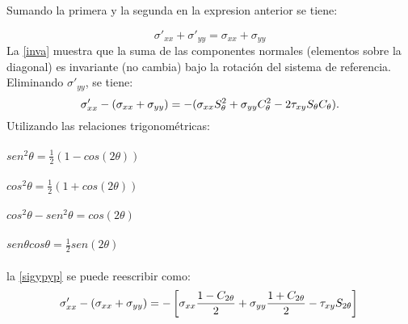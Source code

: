 \documentclass[../notas medios.tex]{subfiles}
\begin{document}
Sumando la primera y la  segunda en la expresion anterior se tiene:

\begin{equation}
	\sigma ' _{xx} + \sigma ' _{yy} =   \sigma _{xx} +  \sigma _{yy}
	\label{inva}
\end{equation}
%
La  \cref{inva} muestra que la suma de las componentes normales (elementos sobre la diagonal) es invariante (no cambia) bajo la rotación del sistema de referencia. Eliminando $\sigma ' _{yy}$, se tiene:\\
%
\begin{equation}
	\sigma ' _{xx} -(\sigma _{xx} + \sigma _{yy}) = -(\sigma _{xx} S^2 _\theta + \sigma _{yy} C^2 _\theta - 2 \tau _{xy} S _\theta C_\theta). \\
\label{sigypyp}
\end{equation}
%
Utilizando las relaciones trigonométricas:\\
\\
	$sen ^2 \theta = \frac{1}{2} \left( 1 - cos \left( 2 \theta \right) \right)$\\\\
	$cos ^2 \theta = \frac{1}{2} \left( 1 + cos \left( 2 \theta \right) \right)$\\\\
	$ cos ^2 \theta -sen ^2 \theta =  cos \left( 2 \theta \right)$\\\\
	$sen \theta cos  \theta = \frac{1}{2} sen \left( 2 \theta \right)$ \\\\
%
la \cref{sigypyp} se puede reescribir como: \\

\begin{equation*}
	\sigma ' _{xx} -(\sigma _{xx} + \sigma _{yy}) = -\left[ \sigma _{xx} \frac{1-C_{2\theta}}{2} + \sigma _{yy} \frac{1+ C _{2\theta}}{2} - \tau _{xy} S_{2\theta} \right] \\
\end{equation*} \\\\
\end{document}
